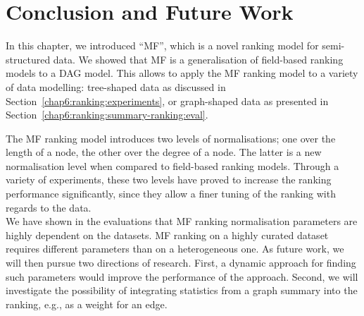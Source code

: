 \section{Conclusion and Future Work}

In this chapter, we introduced ``MF'', which is a novel ranking model for semi-structured data. We showed that \gls{MF} is a generalisation of \gls{field}-based ranking models to a DAG model. This allows to apply the \gls{MF} ranking model to a variety of data modelling: tree-shaped data as discussed in Section~\ref{chap6:ranking:experiments}, or graph-shaped data as presented in Section~\ref{chap6:ranking:summary-ranking:eval}.

The \gls{MF} ranking model introduces two levels of normalisations; one over the length of a node, the other over the degree of a node. The latter is a new normalisation level when compared to field-based ranking models. Through a variety of experiments, these two levels have proved to increase the ranking performance significantly, since they allow a finer tuning of the ranking with regards to the data.\\

We have shown in the evaluations that \gls{MF} ranking normalisation parameters are highly dependent on the datasets. \gls{MF} ranking on a highly curated dataset requires different parameters than on a heterogeneous one. As future work, we will then pursue two directions of research. First, a dynamic approach for finding such parameters would improve the performance of the approach. Second, we will investigate the possibility of integrating statistics from a graph summary into the ranking, e.g., as a weight for an edge.
